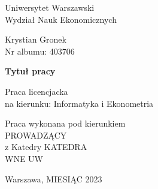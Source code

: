 \begin{titlepage}
    \begin{center}
            
        {\Large
        Uniwersytet Warszawski\\
        Wydział Nauk Ekonomicznych}
        \vspace{3cm}
        
        Krystian Gronek\\
        Nr albumu: 403706
            
        \vspace{1cm}
           
        {\Large
        \textbf{Tytuł pracy}}
           
        \vspace{1.5cm}
        Praca licencjacka \\
        na kierunku: Informatyka i Ekonometria
    \end{center}
        \vspace{3cm}
    \begin{flushright}
        Praca wykonana pod kierunkiem\\
        PROWADZĄCY\\
        z Katedry KATEDRA\\
        WNE UW
    \end{flushright}
        \vfill
    \begin{center}
        Warszawa, MIESIĄC 2023
    \end{center}
\end{titlepage}
